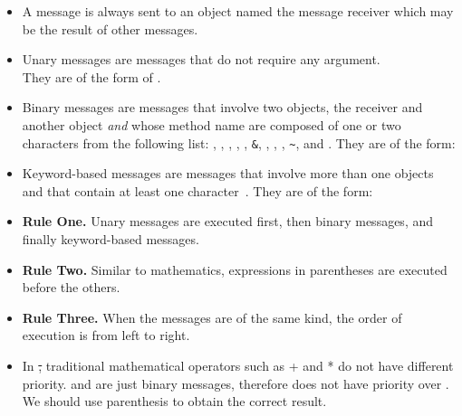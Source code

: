 \summa

\begin{itemize}
\item A message is always sent to an object named the message receiver which may be the result of other messages.

\item Unary messages are messages that do not require any argument.\\
They are of the form of .

\item Binary messages are messages that involve two objects, the receiver and another object \textit{and} whose method name are composed of  one or two characters from the following list: \ct{+}, \ct{-}, \ct{*}, \ct{/}, \ct{|}, \texttt{\&}, \ct{=}, \ct{>}, \ct{<}, \texttt{\~}, and .
They are of the form: 
\item Keyword-based messages are messages that involve more than one objects and that contain at least one character~\ct{:}. They are of the form: 

\item \textbf{Rule One.} Unary messages are executed first, then binary messages, and finally keyword-based messages.
\item \textbf{Rule Two.} Similar to mathematics, expressions in parentheses are executed before the others.
\item \textbf{Rule Three.} When the messages are of the same kind, the order of execution is from left to right.
\item In \st, traditional mathematical operators such as + and * do not have different priority. \ct{+} and \ct{*} are just binary messages, therefore \ct{*} does not have priority over \ct{+}. We should use parenthesis to obtain the correct result.
\end{itemize}

\ifx\wholebook\relax\else\fi
